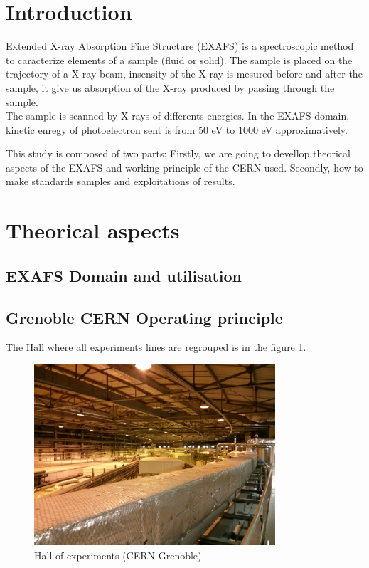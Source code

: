 \documentclass[11pt,a4paper,oneside]{article}
\begin{document}


\section*{Introduction}

Extended X-ray Absorption Fine Structure (EXAFS) is a spectroscopic method to caracterize elements of a sample (fluid or solid). The sample is placed on the trajectory of a X-ray beam, insensity of the X-ray is mesured before and after the sample, it give us absorption of the X-ray produced by passing through the sample.\\
The sample is scanned by X-rays of differents energies. In the EXAFS domain, kinetic enregy of photoelectron sent is from 50 eV to 1000 eV approximatively.

This study is composed of two parts: Firstly, we are going to devellop theorical aspects of the EXAFS and working principle of the CERN used. Secondly, how to make standards samples and exploitations of results.




\newpage


\section{Theorical aspects}
\subsection{EXAFS Domain and utilisation}


\subsection{Grenoble CERN Operating principle}

The Hall where all experiments lines are regrouped is in the figure \ref{Hall}.\medskip

\begin{figure}[H]
    \begin{center}
        \includegraphics[width=0.8\textwidth]{Images/IMG_20151210_213319.jpg}
        \caption{Hall of experiments (CERN Grenoble)}
        \label{Hall}
    \end{center}
\end{figure}
\medskip
\end{document}
